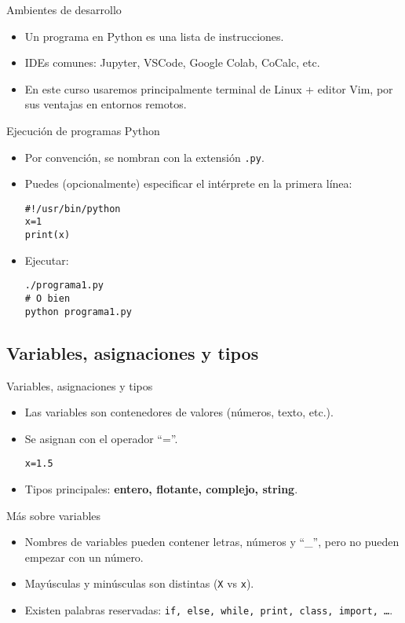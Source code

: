 \documentclass[10pt]{beamer}
\begin{document}
\begin{frame}{Ambientes de desarrollo}
\begin{itemize}
	\item Un programa en Python es una lista de instrucciones.
	\item IDEs comunes: Jupyter, VSCode, Google Colab, CoCalc, etc.
	\item En este curso usaremos principalmente terminal de Linux + editor Vim, por sus ventajas en entornos remotos.
\end{itemize}
\end{frame}

\begin{frame}[fragile]{Ejecución de programas Python}
\begin{itemize}
	\item Por convención, se nombran con la extensión \texttt{.py}.  
	\item Puedes (opcionalmente) especificar el intérprete en la primera línea:
\begin{verbatim}
#!/usr/bin/python
x=1
print(x)
\end{verbatim}
	\item Ejecutar:
\begin{verbatim}
./programa1.py
# O bien
python programa1.py
\end{verbatim}
\end{itemize}
\end{frame}

\subsection{Variables, asignaciones y tipos}

\begin{frame}{Variables, asignaciones y tipos}
\begin{itemize}
	\item Las variables son contenedores de valores (números, texto, etc.).
	\item Se asignan con el operador “=”.
	\begin{example}
\texttt{x=1.5}
	\end{example}
	\item Tipos principales: \textbf{entero, flotante, complejo, string}.
\end{itemize}
\end{frame}

\begin{frame}{Más sobre variables}
\begin{itemize}
	\item Nombres de variables pueden contener letras, números y “\_”, pero no pueden empezar con un número.
	\item Mayúsculas y minúsculas son distintas (\texttt{X} vs \texttt{x}).
	\item Existen palabras reservadas: \texttt{if, else, while, print, class, import, …}.
\end{itemize}
\end{frame}
\end{document}
